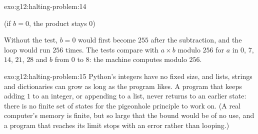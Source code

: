 \begin{solution}{exo:g12:halting-problem:14}
\smallskip\noindent\hspace*{2em} \quad {} \quad {} \quad {}

\noindent\hspace*{2em} \quad {}\quad (if $b = 0$, the product stays $0$)

\noindent\hspace*{2em} \quad {} \quad {}

\noindent\hspace*{2em} \quad {}

\smallskip\noindent Without the test, $b = 0$ would first become $255$ after the subtraction, and the loop would run
$256$ times. The tests compare with $a \times b$ modulo $256$ for $a$ in $0$, $7$, $14$, $21$, $28$ and $b$ from $0$ to
$8$: the machine computes modulo $256$.
\end{solution}

\begin{solution}{exo:g12:halting-problem:15}
Python's integers have no fixed size, and lists, strings and dictionaries can grow as long as the program likes. A
program that keeps adding $1$ to an integer, or appending to a list, never returns to an earlier state: there is no
finite set of states for the pigeonhole principle to work on. (A real computer's memory is finite, but so large that
the bound would be of no use, and a program that reaches its limit stops with an error rather than looping.)
\end{solution}

